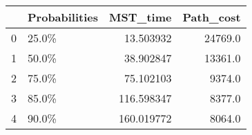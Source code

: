 \begin{tabular}{llrr}
\toprule
{} & Probabilities &    MST\_time &  Path\_cost \\
\midrule
0 &         25.0\% &   13.503932 &    24769.0 \\
1 &         50.0\% &   38.902847 &    13361.0 \\
2 &         75.0\% &   75.102103 &     9374.0 \\
3 &         85.0\% &  116.598347 &     8377.0 \\
4 &         90.0\% &  160.019772 &     8064.0 \\
\bottomrule
\end{tabular}
